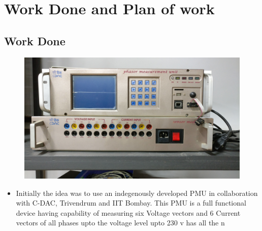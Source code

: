 \section{Work Done and Plan of work}
\subsection*{Work Done}
\begin{figure}[b]
\includegraphics[width=\textwidth]{fig/cdac_pmu.jpg}
\end{figure}
\begin{itemize}
\item Initially the idea was to use an indegenously developed PMU in collaboration with C-DAC, Trivendrum and IIT Bombay. This PMU is a full functional device having capability of measuring six Voltage vectors and 6 Current vectors of all phases upto the voltage level upto 230 v has all the n
\end{itemize}